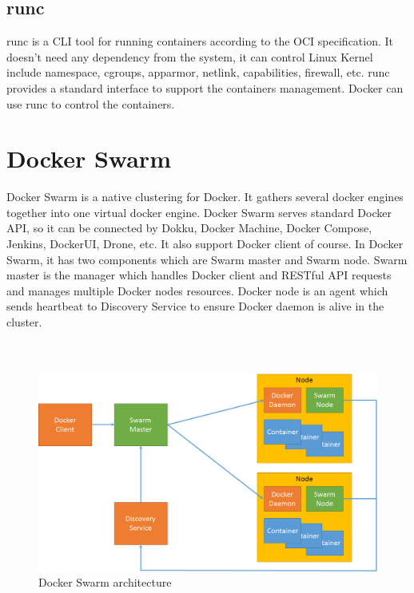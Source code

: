 \subsection{runc}
runc is a CLI tool for running containers according to the OCI specification. It doesn't need any dependency from the system, it can control Linux Kernel include namespace, cgroups, apparmor, netlink, capabilities, firewall, etc.
runc provides a standard interface to support the containers management. Docker can use runc to control the containers.

\section{Docker Swarm}
Docker Swarm is a native clustering for Docker. It gathers several docker engines together into  one virtual docker engine. Docker Swarm serves standard Docker API, so it can be connected by Dokku, Docker Machine, Docker Compose, Jenkins, DockerUI, Drone, etc. It also support Docker client of course.
In Docker Swarm, it has two components which are Swarm master and Swarm node. Swarm master is the manager which handles Docker client and RESTful API requests and manages multiple Docker nodes resources. Docker node is an agent which sends heartbeat to Discovery Service to ensure Docker daemon is alive in the cluster.
\\
\\
\\
\begin{figure}[h]
\begin{center}
\includegraphics[width=15cm]{figure/swarm_docker.png}
\end{center}
\caption{Docker Swarm architecture}
\end{figure}

